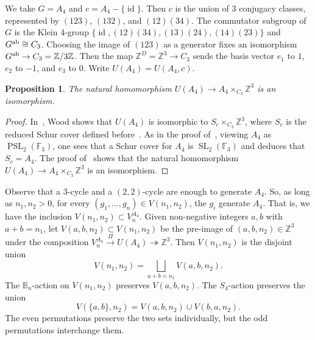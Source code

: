 \documentclass{amsart}
\numberwithin{equation}{section} \numberwithin{figure}{section}
\DeclareMathOperator{\id}{id}
\DeclareMathOperator{\SL}{SL}
\DeclareMathOperator{\PSL}{PSL}
\newcommand\FF{\mathbb{F}}
\newcommand\ZZ{\mathbb{Z}}
\theoremstyle{one}
\newtheorem{proposition}[theorem]{\textbf{Proposition}}
\theoremstyle{definition}
\begin{document}
We take \(G = A_4\) and \(c = A_4- \{\id\}\).
Then \(c\) is the union of 3 conjugacy classes, represented by \((123)\), \((132)\), and \((12)(34)\).
The commutator subgroup of \(G\) is the Klein 4-group \(\{\id, (12)(34), (13)(24), (14)(23)\}\) and \(G^{\rm ab} \cong C_3\).
Choosing the image of \((123)\) as a generator fixes an isomorphism \(G^{\rm ab} \to C_3 = \ZZ/3\ZZ\).
Then the map \(\ZZ^D = \ZZ^3 \to C_3\) sends the basis vector \(e_1\) to \(1\), \(e_2\) to \(-1\), and \(e_3\) to \(0\).
Write \(U(A_4) = U(A_4,c)\). 
\begin{proposition}\label{prop:UGc}
  The natural homomorphism \(U(A_4) \to A_4 \times_{C_3} \ZZ^3\) is an isomorphism.
\end{proposition}
\begin{proof}
 In~\cite[Theorem~2.5]{woo:21}, Wood shows that $U(A_4)$ is isomorphic to $S_c\times_{C_3}\ZZ^3$, where $S_c$ is the reduced Schur cover defined before~\cite[Lemma~2.2]{woo:21}. As in the proof of~\cite[Proposition~8.11]{ell.tra.wes:}, viewing $A_4$ as $\PSL_2(\FF_3)$, one sees that a Schur cover for $A_4$ is $\SL_2(\FF_3)$ and deduces that $S_c=A_4$. The proof of~\cite[Theorem~2.5]{woo:21} shows that the natural homomorphism \(U(A_4) \to A_4 \times_{C_3} \ZZ^3\) is an isomorphism. 
\end{proof}
Observe that a \(3\)-cycle and a \((2,2)\)-cycle are enough to generate \(A_4\).
  So, as long as \(n_1, n_2 > 0\), for every \((g_1,\dots, g_n) \in V(n_1,n_2)\), the \(g_i\) generate \(A_4\). 
  That is, we have the inclusion \(V(n_1,n_2) \subset V^{A_4}_n\).
Given non-negative integers \(a,b\) with \(a+b = n_1\), let \(V(a,b,n_2) \subset V(n_1,n_2)\) be the pre-image of \((a,b,n_2) \in \ZZ^3\) under the composition $V_n^{A_4}\xrightarrow{\Pi} U(A_4)\twoheadrightarrow \ZZ^3$.
Then \(V(n_1,n_2)\) is the disjoint union
\[ V(n_1,n_2) = \bigsqcup_{a+b=n_1} V(a,b,n_2).\]
The \({\mathbb{B}_n}\)-action on \(V(n_1,n_2)\) preserves \(V(a,b,n_2)\).
The \(S_4\)-action preserves the union
\begin{equation}\label{def:Vab}
  V(\{a,b\}, n_2) = V(a,b,n_2) \cup V(b,a,n_2).
\end{equation}
The even permutations preserve the two sets individually, but the odd permutations interchange them.
\end{document}
